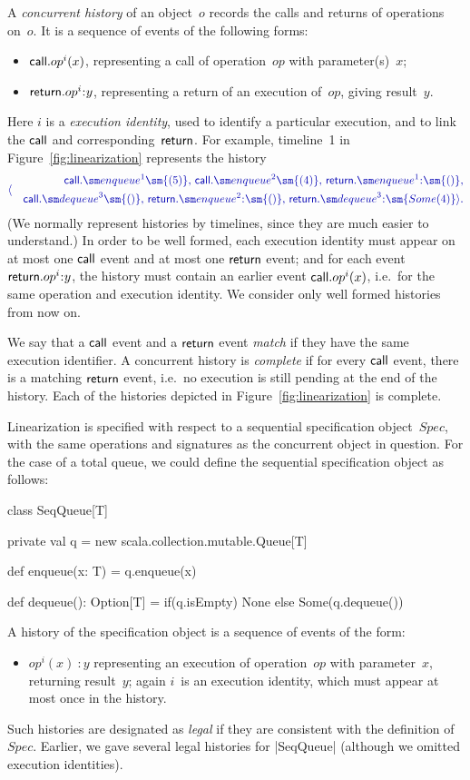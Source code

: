 A \emph{concurrent history} of an object~$o$ records the calls and returns of
operations on~$o$.  It is a sequence of events of the following forms:
%
\begin{itemize}
\item $\mathsf{call}.op^i(x)$, representing a call of operation~$op$ with
  parameter(s)~$x$;
\item $\return.op^i \:: y$, representing a return of an execution of~$op$,
  giving result~$y$.
\end{itemize}
%
Here $i$ is a \emph{execution identity}, used to identify a particular
execution, and to link the $\mathsf{call}$ and corresponding~$\mathsf{return}$.  For example,
timeline~1 in Figure~\ref{fig:linearization} represents the history
\[\mstyle
\langle
  \begin{align}
  \call.\enqueue^1\sm{(5)},\, \call.\enqueue^2\sm{(4)},\,
  \return.\enqueue^1\::\sm{()}, \\
  \quad \call.\dequeue^3\sm{()},\, \return.\enqueue^2\::\sm{()},\,
  \return.\dequeue^3\::\sm{Some(4)} \rangle .
  \end{align}
\]
(We normally represent histories by timelines, since they are much easier to
understand.)  In order to be well formed, each execution identity must appear
on at most one $\mathsf{call}$ event and at most one $\mathsf{return}$ event; and for each
event $\return.op^i\::y$, the history must contain an earlier event
$\mathsf{call}.op^i(x)$, i.e.~for the same operation and execution identity.  We
consider only well formed histories from now on.  

We say that a $\mathsf{call}$ event and a $\mathsf{return}$ event \emph{match}
if they have the same execution identifier.  A concurrent history is
\emph{complete} if for every $\mathsf{call}$ event, there is a matching $\mathsf{return}$
event, i.e.~no execution is still pending at the end of the history.  Each of
the histories depicted in Figure~\ref{fig:linearization} is complete. 

Linearization is specified with respect to a sequential specification
object~$Spec$, with the same operations and signatures as the concurrent
object in question.  For the case of a total queue, we could define the
sequential specification object as follows:
%
\begin{scala}
class SeqQueue[T]{
  private val q = new scala.collection.mutable.Queue[T]

  def enqueue(x: T) = q.enqueue(x)

  def dequeue(): Option[T] = if(q.isEmpty) None else Some(q.dequeue())
}
\end{scala}
%
A history of the specification object is a sequence of events of the form:
%
\begin{itemize}
\item $op^i(x)\::y$ representing an execution of operation~$op$ with
  parameter~$x$, returning result~$y$; again $i$~is an execution identity,
  which must appear at most once in the history.
\end{itemize}
%
Such histories are designated as \emph{legal} if they are consistent with the
definition of~$Spec$.  Earlier, we gave several legal histories for |SeqQueue|
(although we omitted execution identities).

